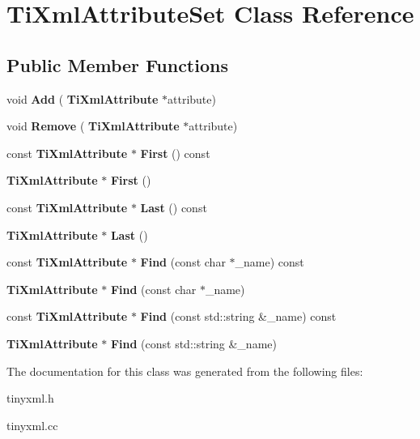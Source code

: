 \section{Ti\+Xml\+Attribute\+Set Class Reference}
\label{classTiXmlAttributeSet}
\subsection*{Public Member Functions}
\begin{DoxyCompactItemize}
\item 
\mbox{\label{classTiXmlAttributeSet_a745e50ddaae3bee93e4589321e0b9c1a}} 
void {\bfseries Add} (\textbf{ Ti\+Xml\+Attribute} $\ast$attribute)
\item 
\mbox{\label{classTiXmlAttributeSet_a924a73d071f2573f9060f0be57879c57}} 
void {\bfseries Remove} (\textbf{ Ti\+Xml\+Attribute} $\ast$attribute)
\item 
\mbox{\label{classTiXmlAttributeSet_a85dfd2b5bae45c94334dced146f5c11a}} 
const \textbf{ Ti\+Xml\+Attribute} $\ast$ {\bfseries First} () const
\item 
\mbox{\label{classTiXmlAttributeSet_a99703bb08ca2aece2d7ef835de339ba0}} 
\textbf{ Ti\+Xml\+Attribute} $\ast$ {\bfseries First} ()
\item 
\mbox{\label{classTiXmlAttributeSet_a3b0d49f3802effcf377f32d9a359302c}} 
const \textbf{ Ti\+Xml\+Attribute} $\ast$ {\bfseries Last} () const
\item 
\mbox{\label{classTiXmlAttributeSet_ab4c4edfb2d74f6ea31aae096743bd6e0}} 
\textbf{ Ti\+Xml\+Attribute} $\ast$ {\bfseries Last} ()
\item 
\mbox{\label{classTiXmlAttributeSet_a39e9f5ed5ebbf02e059dd39cfa6c5052}} 
const \textbf{ Ti\+Xml\+Attribute} $\ast$ {\bfseries Find} (const char $\ast$\+\_\+name) const
\item 
\mbox{\label{classTiXmlAttributeSet_a2f210bed54c832adf1683c44c35727b9}} 
\textbf{ Ti\+Xml\+Attribute} $\ast$ {\bfseries Find} (const char $\ast$\+\_\+name)
\item 
\mbox{\label{classTiXmlAttributeSet_a49280440d5168e23b531e64afd399e50}} 
const \textbf{ Ti\+Xml\+Attribute} $\ast$ {\bfseries Find} (const std\+::string \&\+\_\+name) const
\item 
\mbox{\label{classTiXmlAttributeSet_ab154233f8ecffc0ee0c77a045fa9e69b}} 
\textbf{ Ti\+Xml\+Attribute} $\ast$ {\bfseries Find} (const std\+::string \&\+\_\+name)
\end{DoxyCompactItemize}


The documentation for this class was generated from the following files\+:\begin{DoxyCompactItemize}
\item 
tinyxml.\+h\item 
tinyxml.\+cc\end{DoxyCompactItemize}
